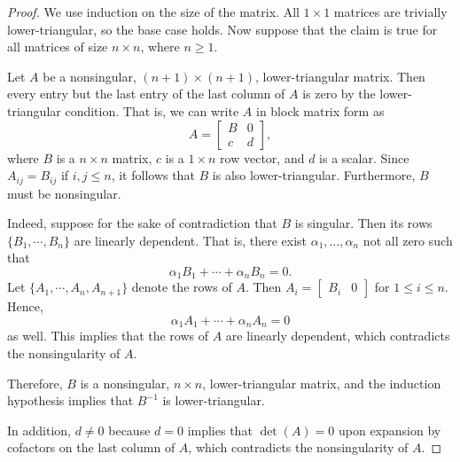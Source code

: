 \documentclass{homework}
\begin{document}
	\begin{proof}
		We use induction on the size of the matrix. All $1\times 1$ matrices are trivially lower-triangular, so the base case holds. Now suppose that the claim is true for all matrices of size $n \times n$, where $n \ge 1$.
		
		Let $A$ be a nonsingular, $(n+1)\times(n+1)$, lower-triangular matrix. Then every entry but the last entry of the last column of $A$ is zero by the lower-triangular condition. That is, we can write $A$ in block matrix form as
		\begin{equation}
			A = \left[\begin{matrix}
				B & 0 \\
				c & d
			\end{matrix}\right],
		\end{equation}
		where $B$ is a $n\times n$ matrix, $c$ is a $1\times n$ row vector, and $d$ is a scalar. Since $A_{ij} = B_{ij}$ if $i,j \le n$, it follows that $B$ is also lower-triangular. Furthermore, $B$ must be nonsingular. 
		
		Indeed, suppose for the sake of contradiction that $B$ is singular. Then its rows $\{B_1,\cdots, B_n\}$ are linearly dependent. That is, there exist $\alpha_1, \dots, \alpha_n$ not all zero such that
		\begin{equation}
			\alpha_1 B_1 + \cdots + \alpha_nB_n = 0.
		\end{equation}
		Let $\{A_1, \cdots, A_n, A_{n+1}\}$ denote the rows of $A$. Then $A_i = \left[\begin{matrix}B_i & 0\end{matrix}\right]$ for $1 \le i \le n$. Hence,
		\begin{equation}
			\alpha_1 A_1 + \cdots + \alpha_n A_n = 0
		\end{equation}
		as well. This implies that the rows of $A$ are linearly dependent, which contradicts the nonsingularity of $A$.
		
		Therefore, $B$ is a nonsingular, $n\times n$, lower-triangular matrix, and the induction hypothesis implies that $B^{-1}$ is lower-triangular.
		
		In addition, $d\ne0$ because $d=0$ implies that $\det(A) = 0$ upon expansion by cofactors on the last column of $A$, which contradicts the nonsingularity of $A$.
		

\end{proof}
\end{document}
